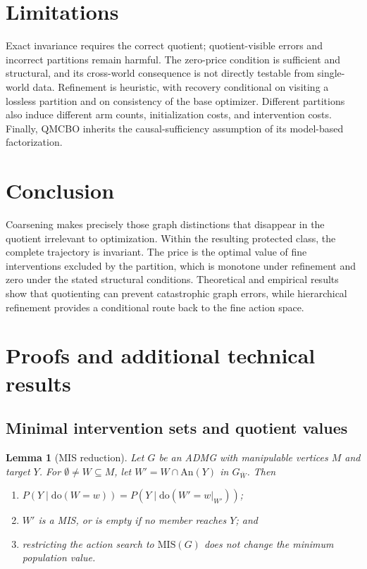 \documentclass[twoside]{article}
\newtheorem{lemma}{Lemma}
\newcommand{\doo}{\mathrm{do}}
\newcommand{\An}{\mathrm{An}}
\begin{document}
\section{Limitations}
\label{sec:limitations}

Exact invariance requires the correct quotient; quotient-visible errors and
incorrect partitions remain harmful. The zero-price condition is sufficient
and structural, and its cross-world consequence is not directly testable
from single-world data. Refinement is heuristic, with recovery conditional
on visiting a lossless partition and on consistency of the base optimizer.
Different partitions also induce different arm counts, initialization costs,
and intervention costs. Finally, QMCBO inherits the causal-sufficiency
assumption of its model-based factorization.

\section{Conclusion}
\label{sec:conclusion}

Coarsening makes precisely those graph distinctions that disappear in the
quotient irrelevant to optimization. Within the resulting protected class,
the complete trajectory is invariant. The price is the optimal value of
fine interventions excluded by the partition, which is monotone under
refinement and zero under the stated structural conditions. Theoretical and
empirical results show that quotienting can prevent catastrophic graph
errors, while hierarchical refinement provides a conditional route back to
the fine action space.




\appendix
\onecolumn
\raggedbottom

\section{Proofs and additional technical results}
\label{app:proofs}

\subsection{Minimal intervention sets and quotient values}

\begin{lemma}[MIS reduction]
\label{lem:mis-reduction}
Let $G$ be an ADMG with manipulable vertices $M$ and target $Y$. For
$\emptyset\ne W\subseteq M$, let
$W'=W\cap\An(Y)$ in $G_{\bar W}$. Then
\begin{enumerate}[label=(\roman*),leftmargin=1.6em,itemsep=1pt]
\item $P(Y\mid\doo(W=w))=P(Y\mid\doo(W'=w|_{W'}))$;
\item $W'$ is a MIS, or is empty if no member reaches $Y$; and
\item restricting the action search to $\mathrm{MIS}(G)$ does not change
the minimum population value.
\end{enumerate}
\end{lemma}
\end{document}
